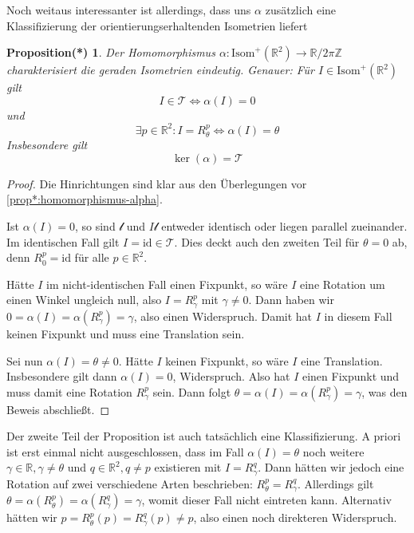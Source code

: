 \documentclass[a4paper, ngerman]{article}
\newcounter{chapter}
\numberwithin{equation}{chapter}
\theoremstyle{plain}
\newtheorem{propositionstrd}{Proposition(*)}[chapter]
\theoremstyle{definition}
\newcommand{\id}{\ensuremath{\text{id}}}
\newcommand{\geradisometr}{\ensuremath{\mathrm{Isom}^+(\mathbb R^2)}}
\newcommand{\anm}[1]{{\color{red} #1}}
\begin{document}
\noindent Noch weitaus interessanter ist allerdings, dass uns \(\alpha\) zusätzlich eine Klassifizierung der orientierungserhaltenden Isometrien liefert
\begin{propositionstrd}\label{prop*:gruppentheo-klassifikation-gerader-isometrien}
    Der Homomorphismus \(\alpha: \mathrm{Isom}^+ (\mathbb R^2) \to \mathbb R/2\pi\mathbb Z\) charakterisiert die geraden Isometrien eindeutig. Genauer: Für \(I \in \geradisometr\) gilt 
    \begin{equation*}
        I \in \mathcal T \iff \alpha(I) = 0
    \end{equation*}
    und
    \begin{equation*}
        \exists p \in \mathbb R^2: I = R_\theta^p \iff \alpha(I) = \theta
    \end{equation*}%
    Insbesondere gilt 
    \begin{equation*}
        \ker(\alpha) = \mathcal T
    \end{equation*}
\end{propositionstrd}
\begin{proof}
    Die Hinrichtungen sind klar aus den Überlegungen vor \cref{prop*:homomorphismus-alpha}. 

    Ist \(\alpha(I)=0\), so sind \(\mathscr l\) und \(I\mathscr l\) entweder identisch oder liegen parallel zueinander. Im identischen Fall gilt \(I = \id \in \mathcal T\). Dies deckt auch den zweiten Teil für \(\theta = 0\) ab, denn \(R_0^p = \id\) für alle \(p \in \mathbb R^2\). 

    Hätte \(I\) im nicht-identischen Fall einen Fixpunkt, so wäre \(I\) eine Rotation um einen Winkel ungleich null, also \(I = R_\gamma^p\) mit \(\gamma\neq0\). Dann haben wir \(0 = \alpha(I) = \alpha(R_\gamma^p) = \gamma\), also einen Widerspruch. Damit hat \(I\) in diesem Fall keinen Fixpunkt und muss eine Translation sein. 

    Sei nun \(\alpha(I)=\theta\neq0\). Hätte \(I\) keinen Fixpunkt, so wäre \(I\) eine Translation. Insbesondere gilt dann \(\alpha(I) = 0\), Widerspruch. Also hat \(I\) einen Fixpunkt und muss damit eine Rotation \(R_\gamma^p\) sein. Dann folgt \(\theta = \alpha(I) = \alpha(R_\gamma^p) = \gamma\), was den Beweis abschließt. 
\end{proof}
Der zweite Teil der Proposition ist auch tatsächlich eine Klassifizierung. A priori ist erst einmal nicht ausgeschlossen, dass im Fall \(\alpha(I) = \theta\) noch weitere \(\gamma \in \mathbb R, \gamma\neq\theta\) und \(q \in \mathbb R^2, q\neq p\) existieren mit \(I = R_\gamma^q\). Dann hätten wir jedoch eine Rotation auf zwei verschiedene Arten beschrieben: \(R_\theta^p = R_\gamma^q\). Allerdings gilt \(\theta = \alpha(R_\theta^p) = \alpha(R_\gamma^q) = \gamma\), womit dieser Fall nicht eintreten kann. Alternativ hätten wir \(p = R_\theta^p(p) = R_\gamma^q(p) \neq p\), also einen noch direkteren Widerspruch. 
\end{document}
